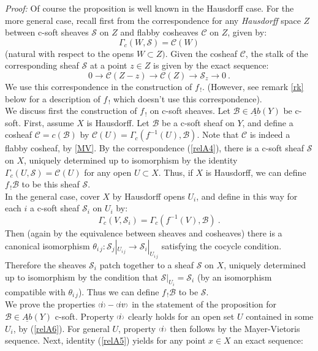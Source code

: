 \documentclass[a4paper]{article}
\newcommand{\rmap}{\longrightarrow}
\newcommand{\es}{\ensuremath{\mathcal{S}}}
\newcommand{\B}{\ensuremath{\mathcal{B}}}
\newcommand{\C}{\ensuremath{\mathcal{C}}}
\newcommand{\gc}{\ensuremath{\Gamma_c}}
\newcommand{\ps}{{\raise 1pt\hbox{\tiny (}}}
\newcommand{\pd}{{\raise 1pt\hbox{\tiny )}}}
\begin{document}
\emph{Proof:} Of course the proposition is well known in the Hausdorff case. For the more general case, recall first from \cite{Bredon} the correspondence for any {\it Hausdorff} space $Z$ between c-soft sheaves $\es$ on $Z$ and flabby cosheaves $\C$ on $Z$, given by:
\begin{equation}
\label{relA4}
 \gc(W, \es) = \C(W) 
\end{equation}
(natural with respect to the opens $W\subset Z).$ Given the cosheaf $\C$, the stalk of the corresponding sheaf $\es$ at a point $z\in Z$ is given by the exact sequence:
\begin{equation}
\label{relA5}
 0\rmap \C(Z- z)\rmap \C(Z)\rmap \es_{z}\rmap 0\ .
\end{equation}
\hspace*{.3in} We use this correspondence in the construction of $f_{\, !}$. (However, see remark \ref{rk} below for a description of $f_{\, !}$ which doesn't use this correspondence).\\
\hspace*{.3in} We discuss first the construction of $f_{\, !}$ on c-soft sheaves. Let $\B\in \underline{Ab}(Y)$ be c-soft. First, assume $X$ is Hausdorff. Let $\B$ be a c-soft sheaf on $Y$, and define a cosheaf $\C= c(\B)$ by $\C(U)= \gc(f^{-1}(U), \B)$. Note that $\C$ is indeed a flabby cosheaf, by \ref{MV}. By the correspondence (\ref{relA4}), there is a c-soft sheaf $\es$ on $X$, uniquely determined up to isomorphism by the identity $\gc(U, \es)= \C(U)$ for any open $U\subset X$. Thus, if $X$ is Hausdorff, we can define $f_{\, !}\B$ to be this sheaf $\es$.\\
\hspace*{.3in} In the general case, cover $X$ by Hausdorff opens $U_{i}$, and define in this way for each $i$ a c-soft sheaf $\es_{i}$ on $U_{i}$ by:
\begin{equation}
\label{relA6} \gc(V, \es_{i}) = \gc(f^{-1}(V), \B)\ .
\end{equation}
Then (again by the equivalence between sheaves and cosheaves) there is a canonical isomorphism $\theta_{i\, j}: \es_{j}|_{U_{i\, j}} \rmap \es_{i}|_{U_{i\, j}}$ satisfying the cocycle condition. Therefore  the sheaves $\es_{i}$ patch together to a sheaf $\es$ on $X$, uniquely determined up to isomorphism by the condition that $\es|_{U_{i}} = \es_{i}$ (by an isomorphism compatible with $\theta_{i\, j}$). Thus we can define $f_{\, !}\B$ to be $\es$.\\
\hspace*{.3in} We prove the properties $\ps i\pd -\ps iv\pd$ in the statement of the proposition for $\B\in \underline{Ab}(Y)$ c-soft. Property $\ps i\pd$ clearly holds for an open set $U$ contained in some $U_{i}$, by (\ref{relA6}). For general $U$, property $\ps i\pd$ then follows by the Mayer-Vietoris sequence. Next, identity (\ref{relA5}) yields for any point $x\in X$ an exact sequence:
\end{document}
